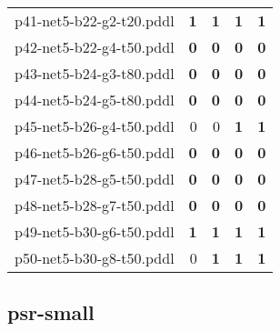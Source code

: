 \documentclass{article}
\begin{document}
\begin{tabular}{@{}lrrrr@{}}
p41-net5-b22-g2-t20.pddl & \textbf{1} & \textbf{1} & \textbf{1} & \textbf{1} \\
p42-net5-b22-g4-t50.pddl & \textbf{0} & \textbf{0} & \textbf{0} & \textbf{0} \\
p43-net5-b24-g3-t80.pddl & \textbf{0} & \textbf{0} & \textbf{0} & \textbf{0} \\
p44-net5-b24-g5-t80.pddl & \textbf{0} & \textbf{0} & \textbf{0} & \textbf{0} \\
p45-net5-b26-g4-t50.pddl & 0 & 0 & \textbf{1} & \textbf{1} \\
p46-net5-b26-g6-t50.pddl & \textbf{0} & \textbf{0} & \textbf{0} & \textbf{0} \\
p47-net5-b28-g5-t50.pddl & \textbf{0} & \textbf{0} & \textbf{0} & \textbf{0} \\
p48-net5-b28-g7-t50.pddl & \textbf{0} & \textbf{0} & \textbf{0} & \textbf{0} \\
p49-net5-b30-g6-t50.pddl & \textbf{1} & \textbf{1} & \textbf{1} & \textbf{1} \\
p50-net5-b30-g8-t50.pddl & 0 & \textbf{1} & \textbf{1} & \textbf{1} \\
\end{tabular}

\hypertarget{coverage-psr-small}{}
\subsection*{psr-small}
\end{document}
